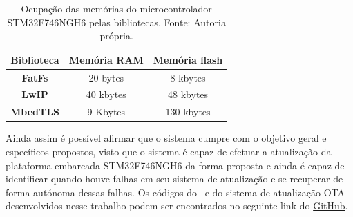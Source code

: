 \begin{table}[H]
    \scriptsize
    \centering
    \begin{tabular}{|c|c|c|}
    \hline
    \textbf{Biblioteca} & \textbf{Memória RAM} & \textbf{Memória flash} \\ \hline
    \textbf{FatFs}      & 20 bytes             & 8 kbytes               \\ \hline
    \textbf{LwIP}       & 40 kbytes            & 48 kbytes              \\ \hline
    \textbf{MbedTLS}    & 9 Kbytes             & 130 kbytes             \\ \hline
    \end{tabular}
    \caption{Ocupação das memórias do microcontrolador STM32F746NGH6 pelas bibliotecas. \newline Fonte: Autoria própria.}
    \label{memorias}
    \end{table}

Ainda assim é possível afirmar que o sistema cumpre com o objetivo geral e específicos propostos, visto que o sistema é capaz de efetuar a atualização da plataforma embarcada STM32F746NGH6 da forma proposta e ainda é capaz de identificar quando houve falhas em seu sistema de atualização e se recuperar de forma autónoma dessas falhas. Os códigos do \bootloader\ e do sistema de atualização OTA desenvolvidos nesse trabalho podem ser encontrados no seguinte link do \href{https://github.com/GustavoCorrea-GC/OTA}{GitHub}.   
